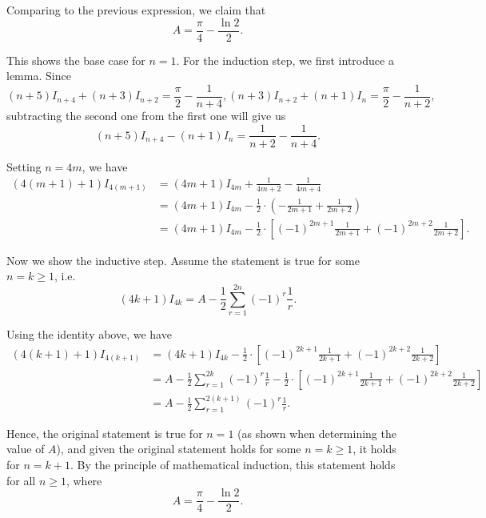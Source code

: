 \begin{enumerate}
          Comparing to the previous expression, we claim that
          \[
              A = \frac{\pi}{4} - \frac{\ln 2}{2}.
          \]

          This shows the base case for \(n = 1\). For the induction step, we first introduce a lemma. Since
          \[
              (n + 5) I_{n + 4} + (n + 3) I_{n + 2} = \frac{\pi}{2} - \frac{1}{n + 4}, (n + 3) I_{n + 2} + (n + 1) I_{n} = \frac{\pi}{2} - \frac{1}{n + 2},
          \]
          subtracting the second one from the first one will give us
          \[
              (n + 5) I_{n + 4} - (n + 1) I_{n} = \frac{1}{n + 2} - \frac{1}{n + 4}.
          \]

          Setting \(n = 4m\), we have
          \begin{align*}
              (4(m + 1) + 1) I_{4 (m + 1)} & = (4m + 1) I_{4m} + \frac{1}{4m + 2} - \frac{1}{4m + 4}                                                             \\
                                           & = (4m + 1) I_{4m} - \frac{1}{2} \cdot \left(-\frac{1}{2m + 1} + \frac{1}{2m + 2}\right)                             \\
                                           & = (4m + 1) I_{4m} - \frac{1}{2} \cdot \left[(-1)^{2m + 1} \frac{1}{2m + 1} + (-1)^{2m + 2} \frac{1}{2m + 2}\right].
          \end{align*}

          Now we show the inductive step. Assume the statement is true for some \(n = k \geq 1\), i.e.
          \[
              (4k + 1) I_{4k} = A - \frac{1}{2} \sum_{r = 1}^{2n} (-1)^r \frac{1}{r}.
          \]

          Using the identity above, we have
          \begin{align*}
              (4(k + 1) + 1) I_{4 (k + 1)} & = (4k + 1) I_{4k} - \frac{1}{2} \cdot \left[(-1)^{2k + 1} \frac{1}{2k + 1} + (-1)^{2k + 2} \frac{1}{2k + 2}\right]                                      \\
                                           & = A - \frac{1}{2} \sum_{r = 1}^{2k} (-1)^r \frac{1}{r} - \frac{1}{2} \cdot \left[(-1)^{2k + 1} \frac{1}{2k + 1} + (-1)^{2k + 2} \frac{1}{2k + 2}\right] \\
                                           & = A - \frac{1}{2} \sum_{r = 1}^{2(k + 1)} (-1)^r \frac{1}{r}.
          \end{align*}

          Hence, the original statement is true for \(n = 1\) (as shown when determining the value of \(A\)), and given the original statement holds for some \(n = k \geq 1\), it holds for \(n = k + 1\). By the principle of mathematical induction, this statement holds for all \(n \geq 1\), where
          \[
              A = \frac{\pi}{4} - \frac{\ln 2}{2}.
          \]
\end{enumerate}